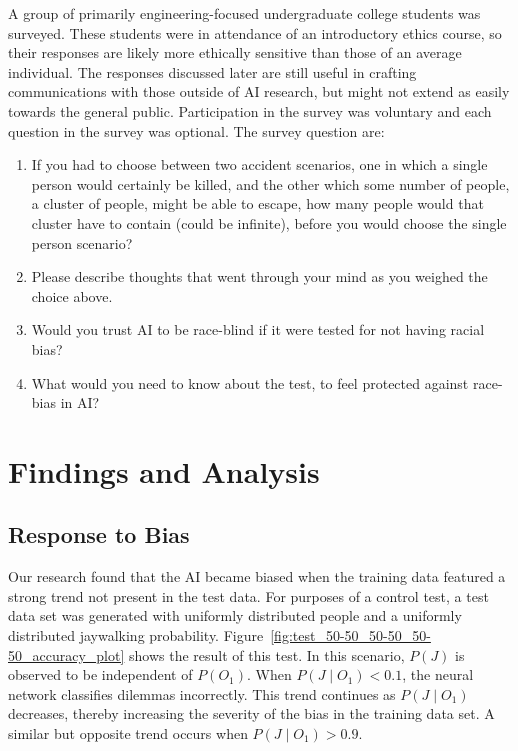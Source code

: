 \documentclass[paper=a4paper]{report}
\begin{document}
A group of primarily engineering-focused undergraduate college students was surveyed. These students
were in attendance of an introductory ethics course, so their responses are likely more ethically
sensitive than those of an average individual. The responses discussed later are still useful in
crafting communications with those outside of AI research, but might not extend as easily towards
the general public. Participation in the survey was voluntary and each question in the survey was
optional. The survey question are:
\begin{enumerate}
    \item If you had to choose between two accident scenarios, one in which a single person would
    certainly be killed, and the other which some number of people, a cluster of people, might be
    able to escape, how many people would that cluster have to contain (could be infinite), before
    you would choose the single person scenario?
    \item Please describe thoughts that went through your mind as you weighed the choice above.
    \item Would you trust AI to be race-blind if it were tested for not having racial bias?
    \item What would you need to know about the test, to feel protected against race-bias in AI?
\end{enumerate}

\FloatBarrier
\chapter{Findings and Analysis}

\section{Response to Bias}

Our research found that the AI became biased when the training data featured a strong trend not
present in the test data. For purposes of a control test, a test data set was generated with
uniformly distributed people and a uniformly distributed jaywalking probability.
Figure~\ref{fig:test_50-50_50-50_50-50_accuracy_plot} shows the result of this test. In this
scenario, $P(J)$ is observed to be independent of $P(O_1)$. When $P(J \mid O_1) < 0.1$, the neural
network classifies dilemmas incorrectly. This trend continues as $P(J \mid O_1)$ decreases, thereby
increasing the severity of the bias in the training data set. A similar but opposite trend occurs
when $P(J \mid O_1) > 0.9$.
\end{document}
